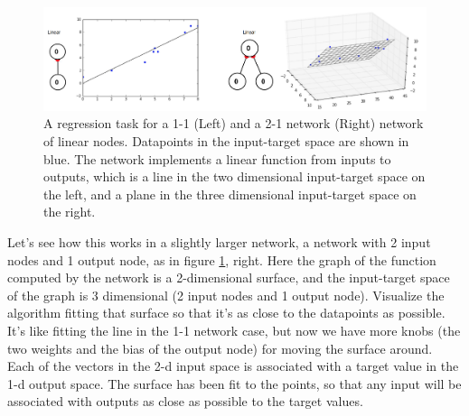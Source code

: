 \begin{figure}[h]
\centering
\includegraphics[scale=.4]{./images/visualizeRegression.png}
\caption[Jeff Yoshimi.]{A regression task for a 1-1 (Left) and a 2-1 network (Right) network of linear nodes. Datapoints in the input-target space are shown in  blue. The network implements a linear function from inputs to outputs, which is a line in the two dimensional input-target space on the left, and a plane in the three dimensional input-target space on the right. }
\label{visualize_regression}
\end{figure}

Let's see how this works in a slightly larger network, a network with 2 input nodes and 1 output node, as in figure \ref{visualize_regression}, right. Here the graph of the function computed by the network is a 2-dimensional surface, and the input-target space of the graph is 3 dimensional (2 input nodes and 1 output node). Visualize the algorithm fitting that surface so that it's as close to the datapoints as possible. It's like fitting the line in the 1-1 network case, but now we have more knobs (the two weights and the bias of the output node) for moving the surface around. Each of the vectors in the 2-d input space is associated with a target value in the 1-d output space. The surface has been fit to the points, so that any input will be associated with outputs as close as possible to the target values. 

